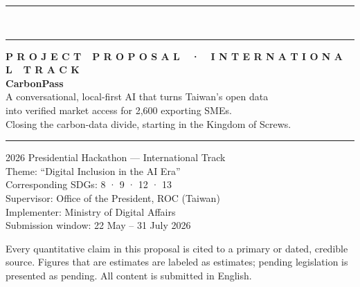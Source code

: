 \documentclass[11pt,a4paper]{article}
\begin{document}
\begin{titlepage}
\noindent
\begin{minipage}{\textwidth}
\vspace{0cm}
{\color{ink}\rule{\textwidth}{14mm}}\\[-2.5pt]
{\color{accent}\rule{\textwidth}{2.6mm}}
\end{minipage}

\vspace{2.4cm}
\begin{minipage}{0.86\textwidth}
\hspace{1.9cm}\begin{minipage}{0.9\textwidth}
{\sffamily\footnotesize\bfseries\color{accent}\MakeUppercase{P r o j e c t\ \ P r o p o s a l\ \ ·\ \ I n t e r n a t i o n a l\ \ T r a c k}}\\[9mm]
{\fontsize{31}{35}\selectfont\bfseries\color{ink}CarbonPass}\\[6mm]
{\large\color{ink!80}A conversational, local-first AI that turns Taiwan's open data\\into verified market access for 2,600 exporting SMEs.}\\[3.5mm]
{\normalsize\color{black!60}Closing the carbon-data divide, starting in the Kingdom of Screws.}\\[13mm]
{\color{ink}\rule{2.6pt}{3.0cm}}\hspace{4mm}%
\begin{minipage}[b]{0.82\textwidth}\small
2026 Presidential Hackathon --- International Track\\[1.5pt]
Theme: ``Digital Inclusion in the AI Era''\\[1.5pt]
Corresponding SDGs: 8 · 9 · 12 · 13\\[1.5pt]
Supervisor: Office of the President, ROC (Taiwan)\\[1.5pt]
Implementer: Ministry of Digital Affairs\\[1.5pt]
Submission window: 22 May -- 31 July 2026
\end{minipage}
\end{minipage}
\end{minipage}

\vfill
\noindent
\begin{minipage}{\textwidth}
\hspace{1.9cm}\begin{minipage}{0.56\textwidth}
\footnotesize\color{black!55}
Every quantitative claim in this proposal is cited to a primary or dated,
credible source. Figures that are estimates are labeled as estimates; pending
legislation is presented as pending. All content is submitted in English.
\end{minipage}
\hfill
\raisebox{-0.4cm}{{\color{mist}\rule{3cm}{3cm}}}\hspace{-3cm}\raisebox{-3.42cm}{{\color{ink}\rule{6.2cm}{3cm}}}
\end{minipage}
\restoregeometry
\end{titlepage}

\thispagestyle{plain}
{\hypersetup{linkcolor=ink}\tableofcontents}
\clearpage







\end{document}

